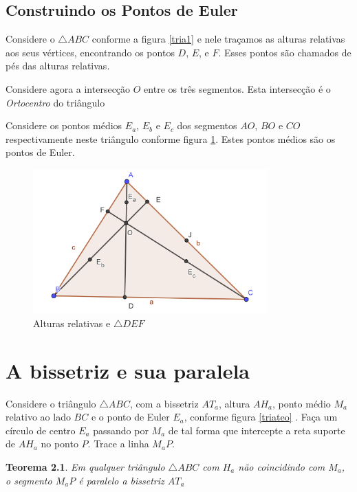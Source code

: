 \documentclass[12pt, openright, a4paper, brazil, openany, oneside]{abntex2}
\newtheorem{teo}{Teorema}
\begin{document}
\section{Construindo os Pontos de Euler}

Considere o $\triangle ABC$ conforme a figura \ref{tria1} e nele traçamos as alturas relativas aos seus vértices, encontrando os pontos $D$, $E$, e $F$. Esses pontos são chamados de pés das alturas relativas.

\newpage

Considere agora a intersecção $O$ entre os três segmentos. Esta intersecção é o \textit{Ortocentro} do triângulo 

Considere os pontos médios $E_a$, $E_b$ e $E_c$ dos segmentos $AO$, $BO$ e $CO$ respectivamente neste triângulo conforme figura \ref{tria4}. Estes pontos médios são os pontos de Euler.

\begin{figure}[h]

    \center

    \includegraphics[width=9cm]{triangulo4.png}
    \caption{Alturas relativas e $\triangle DEF$ \label{tria4}}
    
\end{figure}

\chapter{A bissetriz e sua paralela}

Considere o triângulo $\triangle ABC$, com a bissetriz $AT_a$, altura $AH_a$, ponto médio $M_a$ relativo ao lado $BC$ e o ponto de Euler $E_a$, conforme figura \ref{triateo} . Faça um círculo de centro $E_a$ passando por $M_a$ de tal forma que intercepte a reta suporte de $AH_a$ no ponto $P$. Trace a linha $M_{a}P$.

\begin{teo}\label{teo1}
	Em qualquer triângulo $\triangle ABC$ com $H_a$ não coincidindo com $M_a$, o segmento $M_{a}P$ é paralelo a bissetriz $AT_a$
\end{teo}
\end{document}
